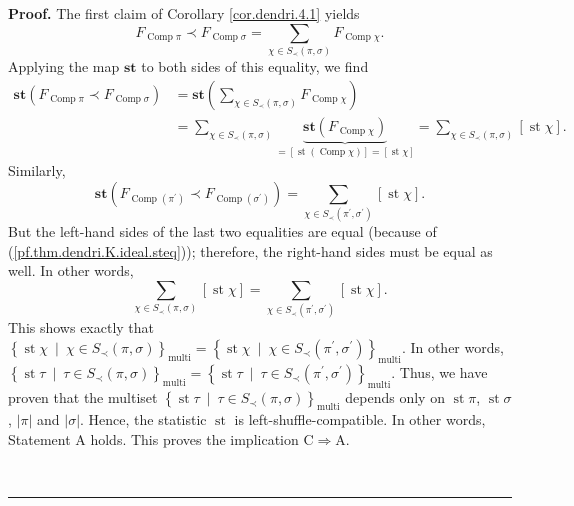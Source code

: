 \documentclass[numbers=enddot,12pt,final,onecolumn,notitlepage]{scrartcl}%
\theoremstyle{definition}
\newenvironment{proof}[1][Proof]{\noindent\textbf{#1.} }{\ \rule{0.5em}{0.5em}}
\newenvironment{verlong}{}{}
\let\sumnonlimits\sum
\renewcommand{\sum}{\sumnonlimits\limits}
\begin{document}
\begin{verlong}
\begin{proof}
The first claim of Corollary \ref{cor.dendri.4.1} yields%
\[
F_{\operatorname*{Comp}\pi}\left.  \prec\right.  F_{\operatorname*{Comp}%
\sigma}=\sum_{\chi\in S_{\prec}\left(  \pi,\sigma\right)  }%
F_{\operatorname*{Comp}\chi}.
\]
Applying the map $\mathbf{st}$ to both sides of this equality, we find%
\begin{align*}
\mathbf{st}\left(  F_{\operatorname*{Comp}\pi}\left.  \prec\right.
F_{\operatorname*{Comp}\sigma}\right)   &  =\mathbf{st}\left(  \sum_{\chi\in
S_{\prec}\left(  \pi,\sigma\right)  }F_{\operatorname*{Comp}\chi}\right) \\
&  =\sum_{\chi\in S_{\prec}\left(  \pi,\sigma\right)  }\underbrace{\mathbf{st}%
\left(  F_{\operatorname*{Comp}\chi}\right)  }_{=\left[  \operatorname{st}%
\left(  \operatorname*{Comp}\chi\right)  \right]  =\left[  \operatorname{st}%
\chi\right]  }=\sum_{\chi\in S_{\prec}\left(  \pi,\sigma\right)  }\left[
\operatorname{st}\chi\right]  .
\end{align*}
Similarly,%
\[
\mathbf{st}\left(  F_{\operatorname*{Comp}\left(  \pi^{\prime}\right)
}\left.  \prec\right.  F_{\operatorname*{Comp}\left(  \sigma^{\prime}\right)
}\right)  =\sum_{\chi\in S_{\prec}\left(  \pi^{\prime},\sigma^{\prime}\right)
}\left[  \operatorname{st}\chi\right]  .
\]
But the left-hand sides of the last two equalities are equal (because of
(\ref{pf.thm.dendri.K.ideal.steq})); therefore, the right-hand sides must be
equal as well. In other words,
\[
\sum_{\chi\in S_{\prec}\left(  \pi,\sigma\right)  }\left[  \operatorname{st}%
\chi\right]  =\sum_{\chi\in S_{\prec}\left(  \pi^{\prime},\sigma^{\prime
}\right)  }\left[  \operatorname{st}\chi\right]  .
\]
This shows exactly that $\left\{  \operatorname{st} \chi
\ \mid\ \chi\in S_{\prec}\left(  \pi,\sigma\right)  \right\}
_{\operatorname*{multi}} =\left\{  \operatorname{st} \chi
\ \mid\ \chi\in S_{\prec}\left(  \pi^{\prime},\sigma^{\prime}\right)
\right\}  _{\operatorname*{multi}} $. In other words, $\left\{
\operatorname{st} \tau   \ \mid\ \tau\in S_{\prec}\left(
\pi,\sigma\right)  \right\}  _{\operatorname*{multi}} =\left\{
\operatorname{st} \tau   \ \mid\ \tau\in S_{\prec}\left(
\pi^{\prime},\sigma^{\prime}\right)  \right\}  _{\operatorname*{multi}} $.
Thus, we have proven that the multiset $\left\{  \operatorname{st} \tau
\ \mid\ \tau\in S_{\prec}\left(  \pi,\sigma\right)  \right\}
_{\operatorname*{multi}} $ depends only on $\operatorname{st} \pi$,
$\operatorname{st} \sigma$, $\left\vert \pi\right\vert $ and
$\left\vert \sigma\right\vert $. Hence, the statistic
$\operatorname{st}$ is left-shuffle-compatible. In other words, Statement A
holds. This proves the implication C$\Longrightarrow$A.


\end{proof}
\end{verlong}
\end{document}
